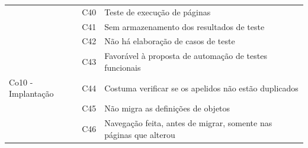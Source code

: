 \begin{longtable}{|M{4.0cm} | M{1.3cm}| m{9.5cm}|}
                                                      & C40            & Teste de execução de páginas                                                                                                                                                                                                                                     \\ 
                                                      & C41            & Sem armazenamento dos resultados de teste                                                                                                                                                                                                                        \\ 
                                                      & C42            & Não há elaboração de casos de teste                                                                                                                                                                                                                              \\ 
                                                      & C43            & Favorável à proposta de automação de testes funcionais                                                                                                                                                                                                           \\ \hline
Co10 - Implantação                   & C44            & Costuma verificar se os apelidos não estão duplicados                                                                                                                                                                                                            \\ 
                                                      & C45            & Não migra as definições de objetos                                                                                                                                                                                                                               \\ 
                                                      & C46            & Navegação feita, antes de migrar, somente nas páginas que alterou                                                                                                                                                                                                \\ 

\end{longtable}
